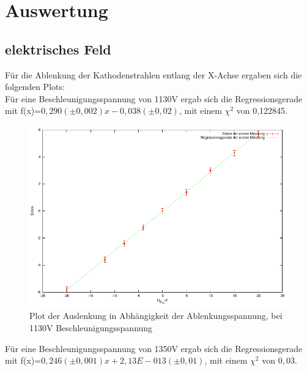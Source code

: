 \documentclass[12pt]{scrartcl}
\begin{document}
\newpage

\section{Auswertung}
\subsection{elektrisches Feld}
Für die Ablenkung der Kathodenstrahlen entlang der X-Achse ergaben sich die folgenden Plots:\\
Für eine Beschleunigungsspannung von 1130V ergab sich die Regressionsgerade mit f(x)=$0,290 (\pm 0,002 ) x  - 0,038 (\pm 0,02)$, mit einem $\chi^2$ von 0,122845.


\begin{figure}[htbp] 
  \centering
    \includegraphics[scale = 1]{x_1.pdf}
  	\caption[Plot der Auslenkung in Abhängigkeit der Ablenkungsspannung, bei 1130V Beschleunigungsspannung]{Plot der Auslenkung in Abhängigkeit der Ablenkungsspannung, bei 1130V Beschleunigungsspannung}
  \label{fig:x_1}
\end{figure}



\newpage

Für eine Beschleunigungsspannung von 1350V ergab sich die Regressionsgerade mit f(x)=$0,246 (\pm 0,001) x  + 2,13E-013	 (\pm 0,01)$, mit einem $\chi^2$ von $0,0\overline{3}$. %
\end{document}
